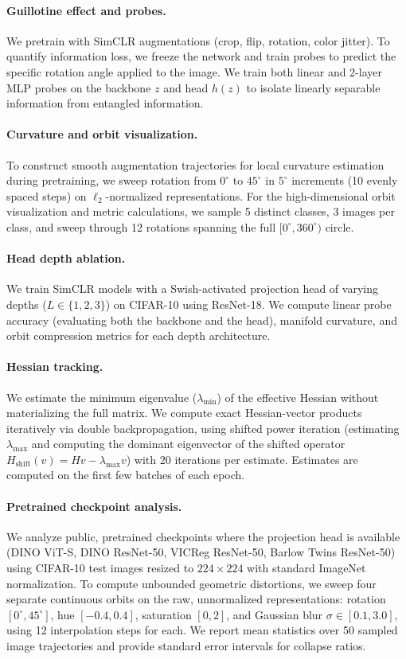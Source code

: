 \documentclass{article}
\theoremstyle{plain}
\theoremstyle{definition}
\theoremstyle{remark}
\begin{document}
\paragraph{Guillotine effect and probes.} We pretrain with SimCLR augmentations (crop, flip, rotation, color jitter). To quantify information loss, we freeze the network and train probes to predict the specific rotation angle applied to the image. We train both linear and 2-layer MLP probes on the backbone $z$ and head $h(z)$ to isolate linearly separable information from entangled information.

\paragraph{Curvature and orbit visualization.} To construct smooth augmentation trajectories for local curvature estimation during pretraining, we sweep rotation from $0^\circ$ to $45^\circ$ in $5^\circ$ increments (10 evenly spaced steps) on $\ell_2$-normalized representations. For the high-dimensional orbit visualization and metric calculations, we sample 5 distinct classes, 3 images per class, and sweep through 12 rotations spanning the full $[0^\circ, 360^\circ)$ circle.

\paragraph{Head depth ablation.} We train SimCLR models with a Swish-activated projection head of varying depths ($L \in \{1, 2, 3\}$) on CIFAR-10 using ResNet-18. We compute linear probe accuracy (evaluating both the backbone and the head), manifold curvature, and orbit compression metrics for each depth architecture.

\paragraph{Hessian tracking.} We estimate the minimum eigenvalue ($\lambda_{\min}$) of the effective Hessian without materializing the full matrix. We compute exact Hessian-vector products iteratively via double backpropagation, using shifted power iteration (estimating $\lambda_{\max}$ and computing the dominant eigenvector of the shifted operator $H_{\text{shift}}(v) = Hv - \lambda_{\max}v$) with 20 iterations per estimate. Estimates are computed on the first few batches of each epoch.

\paragraph{Pretrained checkpoint analysis.} We analyze public, pretrained checkpoints where the projection head is available (DINO ViT-S, DINO ResNet-50, VICReg ResNet-50, Barlow Twins ResNet-50) using CIFAR-10 test images resized to $224\times224$ with standard ImageNet normalization. To compute unbounded geometric distortions, we sweep four separate continuous orbits on the raw, unnormalized representations: rotation $[0^\circ,45^\circ]$, hue $[-0.4,0.4]$, saturation $[0,2]$, and Gaussian blur $\sigma \in [0.1,3.0]$, using 12 interpolation steps for each. We report mean statistics over 50 sampled image trajectories and provide standard error intervals for collapse ratios.
\end{document}
